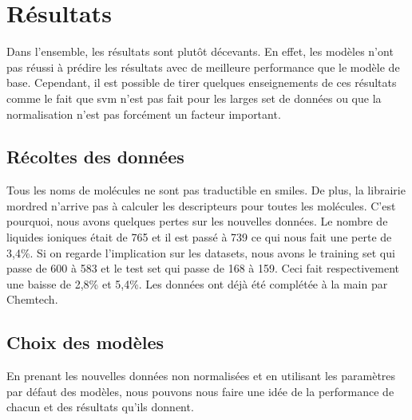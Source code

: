 \chapter{Résultats}
\label{chap:Résultats}

Dans l'ensemble, les résultats sont plutôt décevants.
En effet, les modèles n'ont pas réussi à prédire les résultats avec de meilleure performance que le modèle de base.
Cependant, il est possible de tirer quelques enseignements de ces résultats comme le fait que \acrshort{svm} n'est pas fait pour les larges set de données ou que la normalisation n'est pas forcément un facteur important.


\section{Récoltes des données}

Tous les noms de molécules ne sont pas traductible en \acrshort{smiles}.
De plus, la librairie mordred n'arrive pas à calculer les descripteurs pour toutes les molécules.
C'est pourquoi, nous avons quelques pertes sur les nouvelles données.
Le nombre de liquides ioniques était de 765 et il est passé à 739 ce qui nous fait une perte de 3,4\%.
Si on regarde l'implication sur les datasets, nous avons le training set qui passe de 600 à 583 et le test set qui passe de 168 à 159.
Ceci fait respectivement une baisse de 2,8\% et 5,4\%.
Les données ont déjà été complétée à la main par Chemtech.

\newpage
\section{Choix des modèles}
En prenant les nouvelles données non normalisées et en utilisant les paramètres par défaut des modèles, nous pouvons nous faire une idée de la performance de chacun et des résultats qu'ils donnent.

